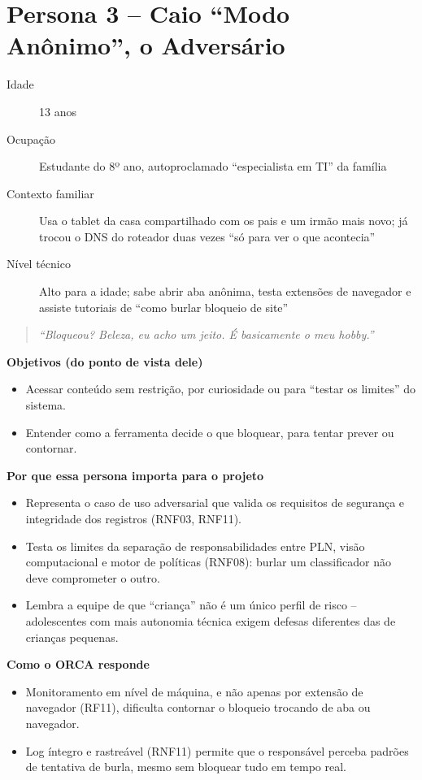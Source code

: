 \documentclass[
    12pt,           %
    oneside,        %
    a4paper,        %
    chapter=TITLE,  %
    english,        %
    brazil          %
]{abntex2}
\begin{document}
\section{Persona 3 -- Caio ``Modo Anônimo'', o Adversário}

\begin{description}
  \item[Idade] 13 anos
  \item[Ocupação] Estudante do 8º ano, autoproclamado ``especialista em TI'' da família
  \item[Contexto familiar] Usa o tablet da casa compartilhado com os pais e um irmão mais novo; já trocou o DNS do roteador duas vezes ``só para ver o que acontecia''
  \item[Nível técnico] Alto para a idade; sabe abrir aba anônima, testa extensões de navegador e assiste tutoriais de ``como burlar bloqueio de site''
\end{description}

\begin{quote}
\textit{``Bloqueou? Beleza, eu acho um jeito. É basicamente o meu hobby.''}
\end{quote}

\textbf{Objetivos (do ponto de vista dele)}
\begin{itemize}
  \item Acessar conteúdo sem restrição, por curiosidade ou para ``testar os limites'' do sistema.
  \item Entender como a ferramenta decide o que bloquear, para tentar prever ou contornar.
\end{itemize}

\textbf{Por que essa persona importa para o projeto}
\begin{itemize}
  \item Representa o caso de uso adversarial que valida os requisitos de segurança e integridade dos registros (RNF03, RNF11).
  \item Testa os limites da separação de responsabilidades entre PLN, visão computacional e motor de políticas (RNF08): burlar um classificador não deve comprometer o outro.
  \item Lembra a equipe de que ``criança'' não é um único perfil de risco -- adolescentes com mais autonomia técnica exigem defesas diferentes das de crianças pequenas.
\end{itemize}

\textbf{Como o ORCA responde}
\begin{itemize}
  \item Monitoramento em nível de máquina, e não apenas por extensão de navegador (RF11), dificulta contornar o bloqueio trocando de aba ou navegador.
  \item Log íntegro e rastreável (RNF11) permite que o responsável perceba padrões de tentativa de burla, mesmo sem bloquear tudo em tempo real.
\end{itemize}
\end{document}

